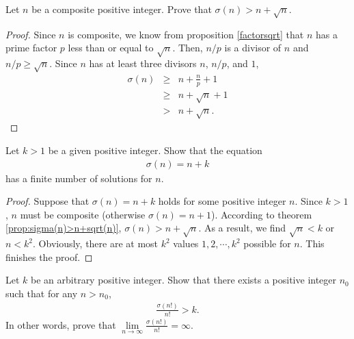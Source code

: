 \documentclass[12pt]{subfile}
\begin{document}
	\begin{proposition}\label{prop:sigma(n)>n+sqrt(n)}
		Let $n$ be a composite positive integer. Prove that $\sigma(n) > n + \sqrt n$.
	\end{proposition}

	\begin{proof}
		Since $n$ is composite, we know from proposition \eqref{factorsqrt} that $n$ has a prime factor $p$ less than or equal to $\sqrt n$. Then, $n/p$ is a divisor of $n$ and $n/p \geq \sqrt n$. Since $n$ has at least three divisors $n$, $n/p$, and $1$,
			\begin{eqnarray*}
				\sigma(n) &\geq& n + \frac{n}{p} + 1\\
						  &\geq& n + \sqrt n + 1\\
						  &>& n+ \sqrt n.
			\end{eqnarray*}
	\end{proof}
	
	
	\begin{theorem}
		Let $k>1$ be a given positive integer. Show that the equation
			\begin{align*}
				\sigma(n) = n + k
			\end{align*}
		has a finite number of solutions for $n$.
	\end{theorem}

	\begin{proof}
		Suppose that $\sigma(n)=n+k$ holds for some positive integer $n$. Since $k>1$, $n$ must be composite (otherwise $\sigma(n)=n+1$). According to theorem \eqref{prop:sigma(n)>n+sqrt(n)}, $\sigma(n) > n + \sqrt n$. As a result, we find $\sqrt n < k$ or $n < k^2$. Obviously, there are at most $k^2$ values $1,2,\cdots,k^2$ possible for $n$. This finishes the proof.
	\end{proof}

	
	\begin{theorem}
		Let $k$ be an arbitrary positive integer. Show that there exists a positive integer $n_0$ such that for any $n>n_0$,
			\begin{align*}
			\frac{\sigma(n!)}{n!} > k.
			\end{align*}
		In other words, prove that $\lim\limits_{n \to \infty} \frac{\sigma(n!)}{n!}= \infty$.
	\end{theorem}
\end{document}
